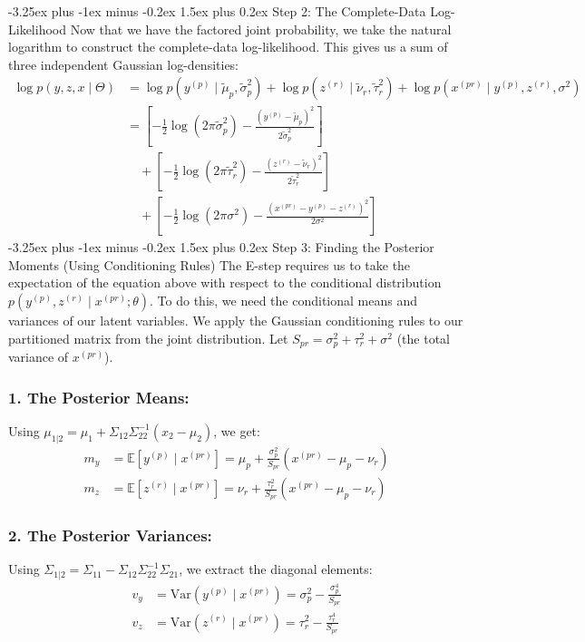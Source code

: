 \documentclass[twoside, 10pt]{article}
\makeatletter
\renewcommand{\paragraph}{\@startsection{paragraph}{4}{0pt}%
    {-3.25ex plus -1ex minus -0.2ex}%
    {1.5ex plus 0.2ex}%
    {\normalfont\normalsize\bfseries}}
\makeatother
\begin{document}
\paragraph{Step 2: The Complete-Data Log-Likelihood}
Now that we have the factored joint probability, we take the natural logarithm to construct the complete-data log-likelihood. This gives us a sum of three independent Gaussian log-densities:
\begin{align*}
\log p(y, z, x \mid \Theta) &= \log p(y^{(p)} \mid \tilde{\mu}_p, \tilde{\sigma}_p^2) + \log p(z^{(r)} \mid \tilde{\nu}_r, \tilde{\tau}_r^2) + \log p(x^{(pr)} \mid y^{(p)}, z^{(r)}, \sigma^2) \\
&= \left[ -\frac{1}{2}\log(2\pi\tilde{\sigma}_p^2) - \frac{(y^{(p)} - \tilde{\mu}_p)^2}{2\tilde{\sigma}_p^2} \right] \\
&\quad + \left[ -\frac{1}{2}\log(2\pi\tilde{\tau}_r^2) - \frac{(z^{(r)} - \tilde{\nu}_r)^2}{2\tilde{\tau}_r^2} \right] \\
&\quad + \left[ -\frac{1}{2}\log(2\pi\sigma^2) - \frac{(x^{(pr)} - y^{(p)} - z^{(r)})^2}{2\sigma^2} \right]
\end{align*}
\paragraph{Step 3: Finding the Posterior Moments (Using Conditioning Rules)}
The E-step requires us to take the expectation of the equation above with respect to the conditional distribution $p(y^{(p)}, z^{(r)} \mid x^{(pr)}; \theta)$.
To do this, we need the conditional means and variances of our latent variables. We apply the Gaussian conditioning rules to our partitioned matrix from the joint distribution.
Let $S_{pr} = \sigma_p^2 + \tau_r^2 + \sigma^2$ (the total variance of $x^{(pr)}$).
\subsubsection*{1. The Posterior Means:} Using $\mu_{1|2} = \mu_1 + \Sigma_{12}\Sigma_{22}^{-1}(x_2 - \mu_2)$, we get:
\begin{align*}
m_y &= \mathbb{E}[y^{(p)} \mid x^{(pr)}] = \mu_p + \frac{\sigma_p^2}{S_{pr}} (x^{(pr)} - \mu_p - \nu_r) \\
m_z &= \mathbb{E}[z^{(r)} \mid x^{(pr)}] = \nu_r + \frac{\tau_r^2}{S_{pr}} (x^{(pr)} - \mu_p - \nu_r)
\end{align*}
\subsubsection*{2. The Posterior Variances:} Using $\Sigma_{1|2} = \Sigma_{11} - \Sigma_{12}\Sigma_{22}^{-1}\Sigma_{21}$, we extract the diagonal elements:
\begin{align*}
v_y &= \text{Var}(y^{(p)} \mid x^{(pr)}) = \sigma_p^2 - \frac{\sigma_p^4}{S_{pr}} \\
v_z &= \text{Var}(z^{(r)} \mid x^{(pr)}) = \tau_r^2 - \frac{\tau_r^4}{S_{pr}}
\end{align*}
\end{document}
